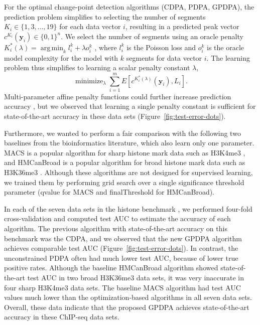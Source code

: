 \documentclass{article}
\DeclareMathOperator*{\argmin}{arg\,min}
\DeclareMathOperator*{\minimize}{minimize}
\begin{document}
For the optimal change-point detection algorithms (CDPA, PDPA, GPDPA),
the prediction problem simplifies to selecting the number of segments
$K_i\in \{1, 3,\dots, 19\}$ for each data vector $i$, resulting in a
predicted peak vector $c^{K_i}(\mathbf y_i)\in\{0,1\}^n$. We select the
number of segments using an oracle penalty
$K_i^*(\lambda)=\argmin_k l_i^k + \lambda o_i^k$
\citep{cleynen2013segmentation}, where $l_i^k$ is the Poisson loss and
$o_i^k$ is the oracle model complexity for the model with $k$
segments for data vector $i$. 
The learning problem thus simplifies to learning a scalar
penalty constant $\lambda$,
\begin{equation}
  \label{eq:learn-lambda}
  \minimize_{\lambda}
  \sum_{i=1}^m E\left[
    c^{K_i^*(\lambda)}(\mathbf y_i), 
    L_i\right].
\end{equation}
Multi-parameter affine penalty functions could further increase prediction
accuracy \citep{HOCKING-penalties}, but we observed that learning a
single penalty constant is sufficient for state-of-the-art accuracy in
these data sets (Figure~\ref{fig:test-error-dots}). 

Furthermore, we wanted to perform a fair comparison with the following
two baselines from the bioinformatics literature, which also learn
only one parameter.
MACS is a popular algorithm for sharp histone mark data such as
H3K4me3 \citep{MACS}, and \mbox{HMCanBroad} is a popular algorithm for broad
histone mark data such as H3K36me3 \citep{HMCan}. Although these
algorithms are not designed for supervised learning, we trained them
by performing grid search over a single significance threshold
parameter (qvalue for MACS and finalThreshold for HMCanBroad).

In each of the seven data sets in the histone benchmark
\citep{HOCKING2016-chipseq}, we performed four-fold cross-validation
and computed test AUC to estimate the accuracy of each algorithm.  The
previous algorithm with state-of-the-art accuracy on this benchmark
was the CDPA, and we observed that the new GPDPA algorithm achieves
comparable test AUC (Figure~\ref{fig:test-error-dots}). In contrast,
the unconstrained PDPA often had much lower test AUC, because of lower
true positive rates. Although the baseline HMCanBroad algorithm showed
state-of-the-art test AUC in two broad H3K36me3 data sets, it was very
inaccurate in four sharp H3K4me3 data sets. The baseline MACS
algorithm had test AUC values much lower than the optimization-based
algorithms in all seven data sets. Overall, these data indicate that
the proposed GPDPA achieves state-of-the-art accuracy in these
ChIP-seq data sets.
\end{document}
